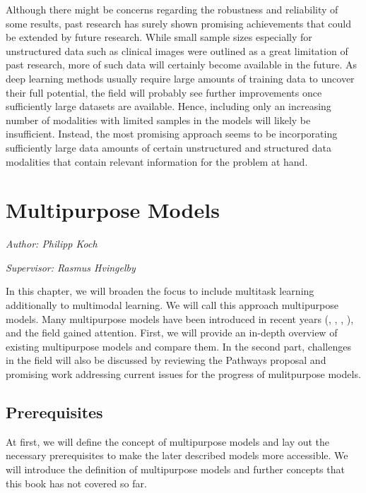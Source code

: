 \documentclass[
]{krantz}
\begin{document}
Although there might be concerns regarding the robustness and reliability of some results, past research has surely shown promising achievements that could be extended by future research. While small sample sizes especially for unstructured data such as clinical images were outlined as a great limitation of past research, more of such data will certainly become available in the future. As deep learning methods usually require large amounts of training data to uncover their full potential, the field will probably see further improvements once sufficiently large datasets are available. Hence, including only an increasing number of modalities with limited samples in the models will likely be insufficient. Instead, the most promising approach seems to be incorporating sufficiently large data amounts of certain unstructured and structured data modalities that contain relevant information for the problem at hand.

\hypertarget{c03-03-multi-purpose}{%
\section{Multipurpose Models}\label{c03-03-multi-purpose}}

\emph{Author: Philipp Koch}

\emph{Supervisor: Rasmus Hvingelby}

In this chapter, we will broaden the focus to include multitask learning additionally to multimodal learning. We will call this approach multipurpose models.
Many multipurpose models have been introduced in recent years (\citet{Kaiser2017}, \citet{Hu2021}, \citet{Wang2022}, \citet{Reed2022}), and the field gained attention.
First, we will provide an in-depth overview of existing multipurpose models and compare them. In the second part, challenges in the field will also be
discussed by reviewing the Pathways proposal \citep{Dean21} and promising work addressing current issues for the progress of mulitpurpose models.

\hypertarget{prerequisites}{%
\subsection{Prerequisites}\label{prerequisites}}

At first, we will define the concept of multipurpose models and lay out the necessary prerequisites to make the later described models more accessible.
We will introduce the definition of multipurpose models and further concepts that this book has not covered so far.
\end{document}
